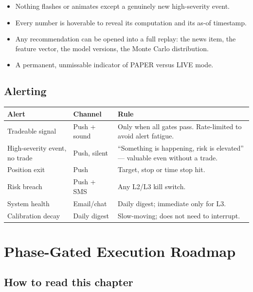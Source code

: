 \begin{keybox}[title={Interaction rules}]
\begin{itemize}
\item Nothing flashes or animates except a genuinely new high-severity event.
\item Every number is hoverable to reveal its computation and its as-of
timestamp.
\item Any recommendation can be opened into a full replay: the news item, the
feature vector, the model versions, the Monte Carlo distribution.
\item A permanent, unmissable indicator of PAPER versus LIVE mode.
\end{itemize}
\end{keybox}

\section{Alerting}

\begin{longtable}{@{}p{3.2cm}p{3.4cm}p{7.8cm}@{}}
\toprule
\textbf{Alert} & \textbf{Channel} & \textbf{Rule}\\
\midrule
Tradeable signal & Push + sound & Only when all gates pass. Rate-limited to
avoid alert fatigue.\\
High-severity event, no trade & Push, silent & ``Something is happening, risk is
elevated'' --- valuable even without a trade.\\
Position exit & Push & Target, stop or time stop hit.\\
Risk breach & Push + SMS & Any L2/L3 kill switch.\\
System health & Email/chat & Daily digest; immediate only for L3.\\
Calibration decay & Daily digest & Slow-moving; does not need to interrupt.\\
\bottomrule
\end{longtable}

\chapter{Phase-Gated Execution Roadmap}
\label{ch:roadmap}

\section{How to read this chapter}

